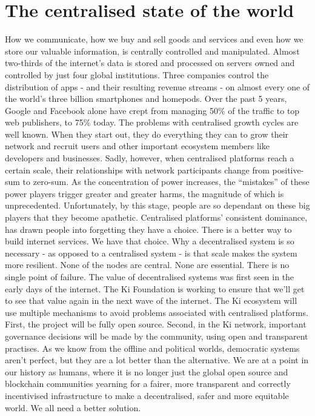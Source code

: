 \section{The centralised state of the world}
How we communicate, how we buy and sell goods and services and even how we store our valuable information, is centrally controlled and manipulated. Almost two-thirds of the internet’s data is stored and processed on servers owned and controlled by just four global institutions. Three companies control the distribution of apps - and their resulting revenue streams - on almost every one of the world’s three billion smartphones and homepods. Over the past 5 years, Google and Facebook alone have crept from managing 50\% of the traffic to top web publishers, to 75\% today.
The problems with centralised growth cycles are well known. When they start out, they do everything they can to grow their network and recruit users and other important ecosystem members like developers and businesses. Sadly, however, when centralised platforms reach a certain scale, their relationships with network participants change from positive-sum to zero-sum. As the concentration of power increases, the “mistakes” of these power players trigger greater and greater harms, the magnitude of which is unprecedented. Unfortunately, by this stage, people are so dependant on these big players that they become apathetic. 
Centralised platforms’ consistent dominance, has drawn people into forgetting they have a choice. There is a better way to build internet services. We have that choice. Why a decentralised system is so necessary - as opposed to a centralised system - is that scale makes the system more resilient. None of the nodes are central. None are essential. There is no single point of failure. 
The value of decentralised systems was first seen in the early days of the internet. The Ki Foundation is working to ensure that we’ll get to see that value again in the next wave of the internet. The Ki ecosystem will use multiple mechanisms to avoid problems associated with centralised platforms. First, the project will be fully open source. Second, in the Ki network, important governance decisions will be made by the community, using open and transparent practises. As we know from the offline and political worlds, democratic systems aren’t perfect, but they are a lot better than the alternative. 
We are at a point in our history as humans, where it is no longer just the global open source and blockchain communities yearning for a fairer, more transparent and correctly incentivised infrastructure to make a decentralised, safer and more equitable world. We all need a better solution. 

